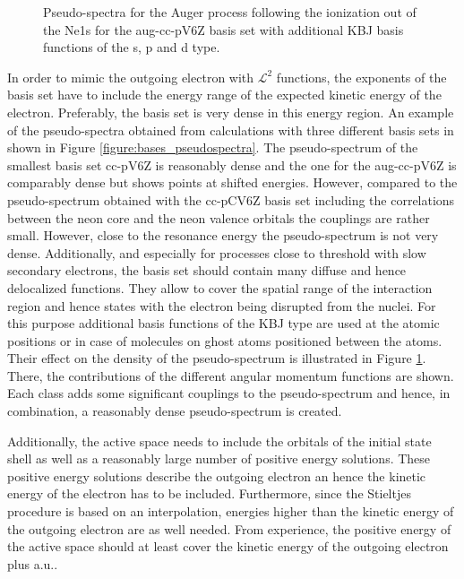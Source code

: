 \begin{figure}[ht]
  \centering
  
  \caption{Pseudo-spectra for the Auger process following the ionization
           out of the Ne1s for the aug-cc-pV6Z basis set with additional
           \ac{KBJ} basis functions of the s, p and d type.}
  \label{figure:bases_jungen}
\end{figure}

In order to mimic the outgoing electron with $\mathcal{L}^2$ functions, the
exponents of the basis set have to include the energy range of the expected
kinetic energy of the electron. Preferably, the basis set is very dense in
this energy region. 
An example of the pseudo-spectra obtained from calculations with three
different basis sets in shown in Figure \ref{figure:bases_pseudospectra}.
The pseudo-spectrum of the smallest basis set cc-pV6Z is reasonably dense and
the one for the aug-cc-pV6Z is comparably dense but shows points at shifted
energies. However, compared to the pseudo-spectrum obtained with the cc-pCV6Z
basis set including the correlations between the neon core and the neon valence
orbitals the couplings are rather small. However, close to the resonance energy
the pseudo-spectrum is not very dense.
Additionally, and especially for processes close to threshold     
with slow                                                               
secondary electrons, the basis set should contain many diffuse and hence
delocalized functions.
They allow to cover the spatial range of the interaction
region and hence states with the electron being disrupted from the nuclei.
For this purpose additional basis functions of the \ac{KBJ}\cite{Kaufmann89}
type are used at the atomic positions or in case of molecules on ghost atoms
positioned between the atoms. Their effect on the density of the pseudo-spectrum
is illustrated in Figure \ref{figure:bases_jungen}. There, the contributions of the
different angular momentum functions are shown. Each class adds some significant
couplings to the pseudo-spectrum and hence, in combination, a reasonably dense
pseudo-spectrum is created.

Additionally, the active space needs to include the orbitals of the initial state
shell as well as a reasonably large number of positive energy solutions. These
positive energy solutions describe the outgoing electron an hence the kinetic energy
of the electron has to be included. Furthermore, since the Stieltjes procedure is
based on an interpolation, energies higher than the kinetic energy of the outgoing
electron are as well needed. From experience, the positive energy of the active
space should at least cover the kinetic energy of the outgoing electron plus
\unit[10]{a.u.}.



